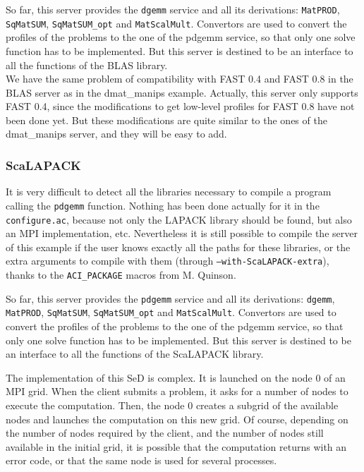   So far, this server provides the \texttt{dgemm} service and all its derivations:
  \texttt{MatPROD}, \texttt{SqMatSUM}, \texttt{SqMatSUM\_opt} and
  \texttt{MatScalMult}. Convertors are used to convert the profiles of the
  problems to the one of the pdgemm service, so that only one solve function has
  to be implemented. But this server is destined to be an interface to all the
  functions of the BLAS library.
  \\

  We have the same problem of compatibility with FAST 0.4 and FAST 0.8 in the BLAS
  server as in the dmat\_manips example. Actually, this server only supports
  FAST 0.4, since the modifications to get low-level profiles for FAST 0.8 have not
  been done yet. But these modifications are quite similar to the ones of the
  dmat\_manips server, and they will be easy to add.

  \subsubsection{ScaLAPACK}

  It is very difficult to detect all the libraries necessary to compile a program
  calling the \texttt{pdgemm} function. Nothing has been done actually for it in
  the \texttt{configure.ac}, because not only the LAPACK library should be found,
  but also an MPI implementation, etc. Nevertheless it is still possible to
  compile the server of this example if the user knows exactly all the paths for
  these libraries, or the extra arguments to compile with them (through
      \texttt{--with-ScaLAPACK-extra}), thanks to the \texttt{ACI\_PACKAGE} macros
  from M. Quinson.

  So far, this server provides the \texttt{pdgemm} service and all its
  derivations: \texttt{dgemm}, \texttt{MatPROD}, \texttt{SqMatSUM},
  \texttt{SqMatSUM\_opt} and \texttt{MatScalMult}. Convertors are used to convert
  the profiles of the problems to the one of the pdgemm service, so that only one
  solve function has to be implemented. But this server is destined to be an
  interface to all the functions of the ScaLAPACK library.

  The implementation of this SeD is complex. It is launched on the node 0 of an
  MPI grid. When the client submits a problem, it asks for a number of nodes to
  execute the computation. Then, the node 0 creates a subgrid of the available
  nodes and launches the computation on this new grid. Of course, depending on the
  number of nodes required by the client, and the number of nodes still available
  in the initial grid, it is possible that the computation returns with an error
  code, or that the same node is used for several processes.
  \\

